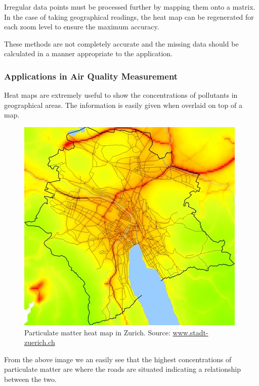 Irregular data points must be processed further by mapping them onto a matrix. In the case of taking geographical readings, the heat map can be regenerated for each zoom level to ensure the maximum accuracy. 

These methods are not completely accurate and the missing data should be calculated in a manner appropriate to the application.

\subsubsection{Applications in Air Quality Measurement}\label{applicationsinaqmeasurement}

Heat maps are extremely useful to show the concentrations of pollutants in geographical areas. The information is easily given when overlaid on top of a map.  

\begin{figure}[H]
        \begin{center}
                \includegraphics[scale=0.5]{./images/heatmaps/zurichpm.jpg}
                \caption{Particulate matter heat map in Zurich. Source: \url{www.stadt-zuerich.ch}}
                \label{fig:pmheatmapzurich}
        \end{center}
\end{figure}

From the above image we an easily see that the highest concentrations of particulate matter are where the roads are situated indicating a relationship between the two. 




